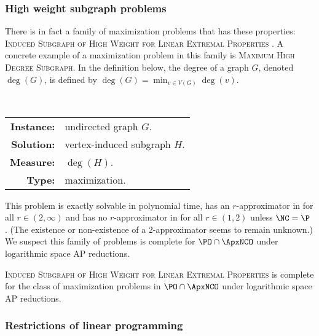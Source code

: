 \documentclass[]{article}
\begin{document}
\subsubsection{High weight subgraph problems}

There is in fact a family of maximization problems that has these properties: \textsc{Induced Subgraph of High Weight for Linear Extremal Properties} \cite[Chapter~3]{dsst97}.
A concrete example of a maximization problem in this family is \textsc{Maximum High Degree Subgraph}.
In the definition below, the degree of a graph $G$, denoted $\deg(G)$, is defined by $\deg(G) = \min_{v \in V(G)} \deg(v)$.

\begin{definition}
  \mbox{} \\
  \begin{tabular}{r l}
    \textbf{Instance:} & undirected graph $G$. \\
    \textbf{Solution:} & vertex-induced subgraph $H$. \\
    \textbf{Measure:} & $\deg(H)$. \\
    \textbf{Type:} & maximization.
  \end{tabular}
\end{definition}

This problem is exactly solvable in polynomial time,  has an $r$-approximator in \FNC{} for all $r \in (2, \infty)$ and has no $r$-approximator in \FNC{} for all $r \in (1, 2)$ unless $\NC = \P$ \cite{am84}.
(The existence or non-existence of a 2-approximator seems to remain unknown.)
We suspect this family of problems is complete for $\PO \cap \ApxNCO$ under logarithmic space AP reductions.

\begin{conjecture}
  \textsc{Induced Subgraph of High Weight for Linear Extremal Properties} is complete for the class of maximization problems in $\PO \cap \ApxNCO$ under logarithmic space AP reductions.
\end{conjecture}

\subsubsection{Restrictions of linear programming}
\end{document}
